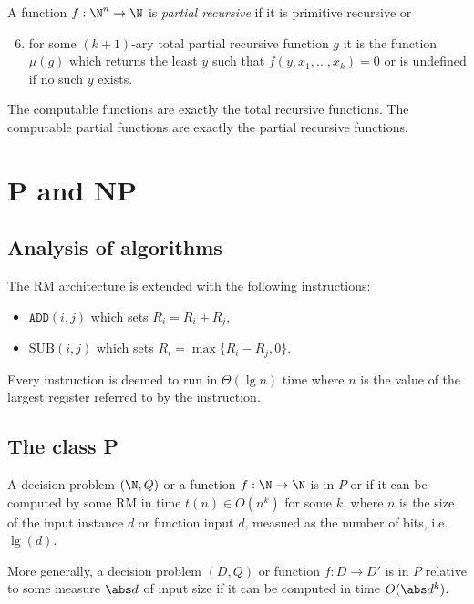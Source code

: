 \documentclass{article}
\begin{document}
\begin{definition}
    A function $f:\N^n\to\N$ is \emph{partial recursive} if it is primitive recursive or 
    \begin{enumerate}[label=R\arabic*.]
        \setcounter{enumi}{5}
        \item for some $(k+1)$-ary total partial recursive function $g$ it is the function $\mu(g)$
            which returns the least $y$ such that $f(y,x_1,...,x_k)=0$ or is undefined if no such $y$
            exists.
    \end{enumerate}
\end{definition}

\begin{theorem}[Notes I.45]
    The computable functions are exactly the total recursive functions. The computable partial functions 
    are exactly the partial recursive functions. 
\end{theorem}

\section{P and NP}

\subsection{Analysis of algorithms}

\begin{definition}
    The RM architecture is extended with the following instructions:
    \begin{itemize}
        \item $\texttt{ADD}(i,j)$ which sets $R_i=R_i+R_j$,
        \item $\text{SUB}(i,j)$ which sets $R_i=\max\{R_i-R_j,0\}$.
    \end{itemize}
    Every instruction is deemed to run in $\Theta(\lg n)$ time where $n$ 
    is the value of the largest register referred to by the instruction.
\end{definition}

\subsection{The class P}

\begin{definition}
    A decision problem $(\N,Q)$ or a function $f:\N\to\N$ is in $P$ or \ptime if 
    it can be computed by some RM in time $t(n)\in O(n^k)$ for some $k$, where $n$ is the size 
    of the input instance $d$ or function input $d$, measued as the number of bits, i.e. $\lg(d)$.

    More generally, a decision problem $(D,Q)$ or function $f:D\to D'$ is in $P$ relative to some 
    measure $\abs d$ of input size if it can be computed in time $O(\abs d^k)$.
\end{definition}
\end{document}
